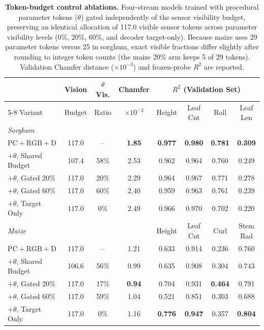 \documentclass[10pt,twocolumn,letterpaper]{article}
\begin{document}
\begin{table}[t]
  \caption{\textbf{Token-budget control ablations.} Four-stream models trained with procedural parameter tokens ($\theta$) gated independently of the sensor visibility budget, preserving an identical allocation of 117.0 visible sensor tokens across parameter visibility levels (0\%, 20\%, 60\%, and decoder target-only). Because maize uses 29 parameter tokens versus 25 in sorghum, exact visible fractions differ slightly after rounding to integer token counts (the maize 20\% arm keeps 5 of 29 tokens). Validation Chamfer distance ($\times 10^{-3}$) and frozen-probe $R^2$ are reported.}
  \label{tab:control}\label{tab:token_budget}
  \centering\scriptsize
  \setlength{\tabcolsep}{3.2pt}
  \begin{tabular}{l cc c cccc}
    \toprule
    & Vision & $\theta$ Vis. & Chamfer & \multicolumn{4}{c}{$R^2$ (Validation Set)} \\
    \cmidrule(lr){5-8}
    Variant & Budget & Ratio & $\times10^{-3}$ & Height & Leaf Cnt & Roll & Leaf Len \\
    \midrule
    \multicolumn{8}{l}{\emph{Sorghum}} \\
    $\mathrm{PC}+\mathrm{RGB}+\mathrm{D}$ & 117.0 & -- & \textbf{1.85} & \textbf{0.977} & \textbf{0.980} & \textbf{0.781} & \textbf{0.309} \\
    $+\theta$, Shared Budget & 107.4 & 58\% & 2.53 & 0.962 & 0.964 & 0.760 & 0.249 \\
    $+\theta$, Gated 20\% & 117.0 & 20\% & 2.29 & 0.964 & 0.967 & 0.771 & 0.278 \\
    $+\theta$, Gated 60\% & 117.0 & 60\% & 2.40 & 0.959 & 0.963 & 0.761 & 0.239 \\
    $+\theta$, Target Only & 117.0 & 0\% & 2.49 & 0.966 & 0.970 & 0.702 & 0.220 \\
    \midrule
    \multicolumn{4}{l}{\emph{Maize}} & Height & Leaf Cnt & Curl & Stem Rad \\
    $\mathrm{PC}+\mathrm{RGB}+\mathrm{D}$ & 117.0 & -- & 1.21 & 0.633 & 0.914 & 0.236 & 0.760 \\
    $+\theta$, Shared Budget & 106.6 & 56\% & 0.99 & 0.635 & 0.908 & 0.304 & 0.743 \\
    $+\theta$, Gated 20\% & 117.0 & 17\% & \textbf{0.94} & 0.704 & 0.931 & \textbf{0.464} & 0.791 \\
    $+\theta$, Gated 60\% & 117.0 & 59\% & 1.04 & 0.521 & 0.851 & 0.303 & 0.688 \\
    $+\theta$, Target Only & 117.0 & 0\% & 1.16 & \textbf{0.776} & \textbf{0.947} & 0.357 & \textbf{0.804} \\
    \bottomrule
  \end{tabular}
\end{table}
\end{document}
